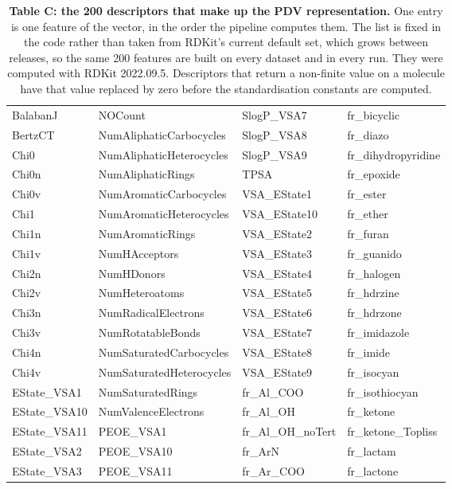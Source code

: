 
{\small
\begin{longtable}{@{}llll@{}}
\caption{\textbf{Table C: the 200 descriptors that make up the PDV representation.}
One entry is one feature of the vector, in the order the pipeline computes them. The list is fixed in the code rather than taken from RDKit's current default set, which grows between releases, so the same 200 features are built on every dataset and in every run. They were computed with RDKit 2022.09.5. Descriptors that return a non-finite value on a molecule have that value replaced by zero before the standardisation constants are computed.}
\label{af1:pdv}\\
\toprule
\endfirsthead
\toprule
\endhead
BalabanJ & NOCount & SlogP\_VSA7 & fr\_bicyclic \\
BertzCT & NumAliphaticCarbocycles & SlogP\_VSA8 & fr\_diazo \\
Chi0 & NumAliphaticHeterocycles & SlogP\_VSA9 & fr\_dihydropyridine \\
Chi0n & NumAliphaticRings & TPSA & fr\_epoxide \\
Chi0v & NumAromaticCarbocycles & VSA\_EState1 & fr\_ester \\
Chi1 & NumAromaticHeterocycles & VSA\_EState10 & fr\_ether \\
Chi1n & NumAromaticRings & VSA\_EState2 & fr\_furan \\
Chi1v & NumHAcceptors & VSA\_EState3 & fr\_guanido \\
Chi2n & NumHDonors & VSA\_EState4 & fr\_halogen \\
Chi2v & NumHeteroatoms & VSA\_EState5 & fr\_hdrzine \\
Chi3n & NumRadicalElectrons & VSA\_EState6 & fr\_hdrzone \\
Chi3v & NumRotatableBonds & VSA\_EState7 & fr\_imidazole \\
Chi4n & NumSaturatedCarbocycles & VSA\_EState8 & fr\_imide \\
Chi4v & NumSaturatedHeterocycles & VSA\_EState9 & fr\_isocyan \\
EState\_VSA1 & NumSaturatedRings & fr\_Al\_COO & fr\_isothiocyan \\
EState\_VSA10 & NumValenceElectrons & fr\_Al\_OH & fr\_ketone \\
EState\_VSA11 & PEOE\_VSA1 & fr\_Al\_OH\_noTert & fr\_ketone\_Topliss \\
EState\_VSA2 & PEOE\_VSA10 & fr\_ArN & fr\_lactam \\
EState\_VSA3 & PEOE\_VSA11 & fr\_Ar\_COO & fr\_lactone \\

\end{longtable}}
